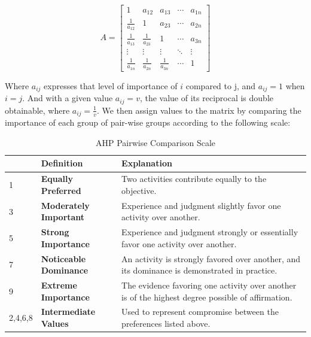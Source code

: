 \documentclass[12pt]{article}
\begin{document}
\[
A = 
\begin{bmatrix}
    1 & a_{12} & a_{13} & \cdots & a_{1n} \\
    \frac{1}{a_{12}} & 1 & a_{23} & \cdots & a_{2n} \\
    \frac{1}{a_{13}} & \frac{1}{a_{23}} & 1 & \cdots & a_{3n} \\
    \vdots & \vdots & \vdots & \ddots & \vdots \\
    \frac{1}{a_{1n}} & \frac{1}{a_{2n}} & \frac{1}{a_{3n}} & \cdots & 1
\end{bmatrix}
\]

Where \(a_{ij}\) expresses that level of importance of \(i\) compared to j, and \(a_{ij}=1\) when \(i=j\). And with a given value \(a_{ij}=v\), the value of its reciprocal is double obtainable, where \(a_{ij}=\frac{1}{v}\). We then assign values to the matrix by comparing the importance of each group of pair-wise groups according to the following scale:

\begin{table}[ht]
    \centering
    \begin{tabular}{@{}llp{10cm}@{}}
        \toprule
                 &\textbf{Definition} & \textbf{Explanation} \\ 
        \midrule
        1 & \textbf{Equally Preferred} & Two activities contribute equally to the objective. \\
        3 & \textbf{Moderately Important} & Experience and judgment slightly favor one activity over another. \\
        5 & \textbf{Strong Importance} & Experience and judgment strongly or essentially favor one activity over another. \\
        7 & \textbf{Noticeable Dominance} & An activity is strongly favored over another, and its dominance is demonstrated in practice. \\
        9 & \textbf{Extreme Importance} & The evidence favoring one activity over another is of the highest degree possible of affirmation. \\
        2,4,6,8 & \textbf{Intermediate Values} & Used to represent compromise between the preferences listed above. \\
        \bottomrule
    \end{tabular}
    \caption{AHP Pairwise Comparison Scale}
    \label{tab:ahp_scale}
\end{table}
\end{document}
